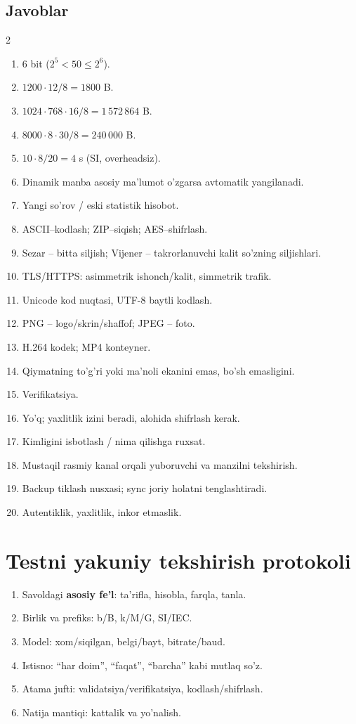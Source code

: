 \documentclass[11pt,a4paper,oneside]{book}
\begin{document}
\subsection*{Javoblar}
\begin{multicols}{2}
\begin{enumerate}
\item 6 bit ($2^5<50\le2^6$).
\item $1200\cdot12/8=1800$ B.
\item $1024\cdot768\cdot16/8=1\,572\,864$ B.
\item $8000\cdot8\cdot30/8=240\,000$ B.
\item $10\cdot8/20=4$ s (SI, overheadsiz).
\item Dinamik manba asosiy ma'lumot o'zgarsa avtomatik yangilanadi.
\item Yangi so'rov / eski statistik hisobot.
\item ASCII--kodlash; ZIP--siqish; AES--shifrlash.
\item Sezar -- bitta siljish; Vijener -- takrorlanuvchi kalit so'zning siljishlari.
\item TLS/HTTPS: asimmetrik ishonch/kalit, simmetrik trafik.
\item Unicode kod nuqtasi, UTF-8 baytli kodlash.
\item PNG -- logo/skrin/shaffof; JPEG -- foto.
\item H.264 kodek; MP4 konteyner.
\item Qiymatning to'g'ri yoki ma'noli ekanini emas, bo'sh emasligini.
\item Verifikatsiya.
\item Yo'q; yaxlitlik izini beradi, alohida shifrlash kerak.
\item Kimligini isbotlash / nima qilishga ruxsat.
\item Mustaqil rasmiy kanal orqali yuboruvchi va manzilni tekshirish.
\item Backup tiklash nusxasi; sync joriy holatni tenglashtiradi.
\item Autentiklik, yaxlitlik, inkor etmaslik.
\end{enumerate}
\end{multicols}

\section{Testni yakuniy tekshirish protokoli}
\begin{enumerate}
\item Savoldagi \textbf{asosiy fe'l}: ta'rifla, hisobla, farqla, tanla.
\item Birlik va prefiks: b/B, k/M/G, SI/IEC.
\item Model: xom/siqilgan, belgi/bayt, bitrate/baud.
\item Istisno: ``har doim'', ``faqat'', ``barcha'' kabi mutlaq so'z.
\item Atama jufti: validatsiya/verifikatsiya, kodlash/shifrlash.
\item Natija mantiqi: kattalik va yo'nalish.
\end{enumerate}
\end{document}
